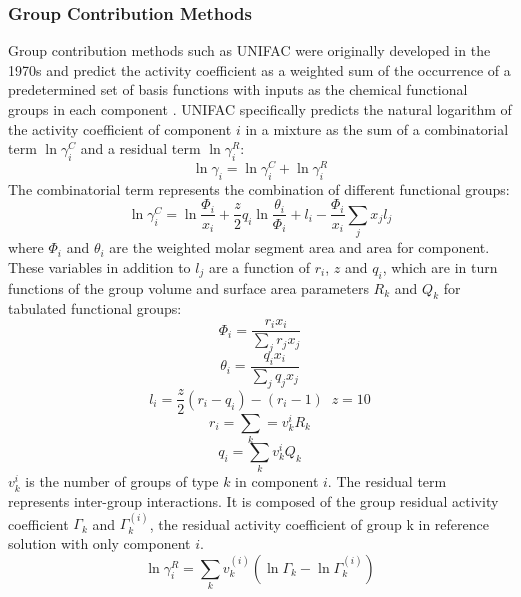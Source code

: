 \subsubsection{Group Contribution Methods}

Group contribution methods such as UNIFAC were originally developed in the 1970s and predict the activity coefficient as a weighted sum of the occurrence of a predetermined set of basis functions with inputs as the chemical functional groups in each component \cite{Fredenslund1975}. UNIFAC specifically predicts the natural logarithm of the activity coefficient of component $i$ in  a mixture as the sum of a combinatorial term $\ln \gamma_i^C$ and a residual term $\ln \gamma_i^R$:
\begin{equation}
    \ln \gamma_i = \ln \gamma_i^C + \ln \gamma_i^R
\end{equation}
The combinatorial term represents the combination of different functional groups:
\begin{equation}
    \ln  \gamma^C_i = \ln \frac{\Phi_i}{x_i} + \frac{z}{2} q_i \ln \frac{\theta_i}{\Phi_i} + l_i - \frac{\Phi_i}{x_i} \sum_jx_jl_j
\end{equation}
where $\Phi_i$ and $\theta_i$ are the weighted molar segment area and area for component. These variables in addition to $l_j$ are a function of $r_i$, $z$ and $q_i$, which are  in turn functions of the group volume and surface area parameters $R_k$ and $Q_k$ for tabulated functional groups:
\begin{equation}
    \Phi_i  = \frac{r_i x_i}{\sum_j r_j x_j}
\end{equation}
\begin{equation}
    \theta_i = \frac{q_i x_i}{\sum_j q_j x_j}
\end{equation}
\begin{equation}
    l_i = \frac{z}{2}(r_i-q_i) - (r_i -1) \;\; z=10
\end{equation}
\begin{equation}
    r_i  = \sum_k = v_k^i R_k
\end{equation}
\begin{equation}
    q_i = \sum_k v_k^i Q_k
\end{equation}
$v_k^i$ is the number of groups of type $k$ in component $i$. The residual term represents inter-group interactions. It is composed of the group residual activity coefficient $\Gamma_k$ and  $\Gamma_k^{(i)}$, the residual activity coefficient of group k in reference solution with only component $i$.
\begin{equation}
    \ln \gamma^R_i = \sum_k v_k^{(i)}(\ln \Gamma_k - \ln \Gamma_k^{(i)})
\end{equation}
